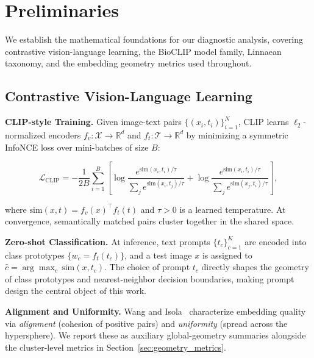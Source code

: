 
\section{Preliminaries}
\label{sec:preliminaries}

We establish the mathematical foundations for our diagnostic analysis, covering contrastive vision-language learning, the BioCLIP model family, Linnaean taxonomy, and the embedding geometry metrics used throughout.

\subsection{Contrastive Vision-Language Learning}

\noindent\textbf{CLIP-style Training.}
Given image-text pairs $\{(x_i, t_i)\}_{i=1}^{N}$, CLIP learns $\ell_2$-normalized encoders
$f_v : \mathcal{X} \to \mathbb{R}^{d}$ and $f_t : \mathcal{T} \to \mathbb{R}^{d}$
by minimizing a symmetric InfoNCE loss over mini-batches of size $B$:

\begin{equation}
\mathcal{L}_{\mathrm{CLIP}}
= -\frac{1}{2B}\sum_{i=1}^{B}
\left[
\log\frac{e^{\mathrm{sim}(x_i,t_i)/\tau}}{\sum_{j} e^{\mathrm{sim}(x_i,t_j)/\tau}}
+
\log\frac{e^{\mathrm{sim}(x_i,t_i)/\tau}}{\sum_{j} e^{\mathrm{sim}(x_j,t_i)/\tau}}
\right],
\label{eq:clip_loss}
\end{equation}

where $\mathrm{sim}(x,t)=f_v(x)^{\top}f_t(t)$ and $\tau>0$ is a learned temperature.
At convergence, semantically matched pairs cluster together in the shared space.

\noindent\textbf{Zero-shot Classification.}
At inference, text prompts $\{t_c\}_{c=1}^{K}$ are encoded into class prototypes
$\{w_c = f_t(t_c)\}$, and a test image $x$ is assigned to
$\hat{c} = \arg\max_{c}\,\mathrm{sim}(x, t_c)$.
The choice of prompt $t_c$ directly shapes the geometry of class prototypes and
nearest-neighbor decision boundaries, making prompt design the central object of
this work.

\noindent\textbf{Alignment and Uniformity.}
Wang and Isola~\cite{wang2020understanding} characterize embedding quality via
\emph{alignment} (cohesion of positive pairs) and \emph{uniformity} (spread across
the hypersphere). We report these as auxiliary global-geometry summaries alongside
the cluster-level metrics in Section~\ref{sec:geometry_metrics}.


